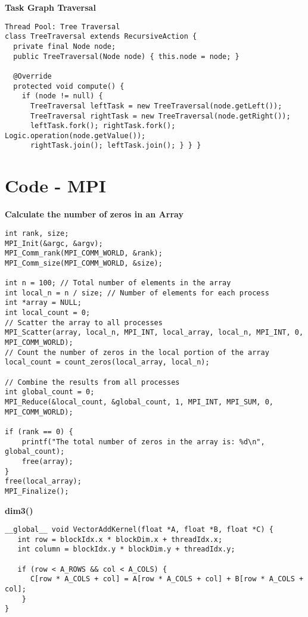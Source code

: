 \textbf{Task Graph Traversal}
\begin{lstlisting}[style=csharp]
Thread Pool: Tree Traversal
class TreeTraversal extends RecursiveAction {
  private final Node node;
  public TreeTraversal(Node node) { this.node = node; }
  
  @Override
  protected void compute() {
    if (node != null) {
      TreeTraversal leftTask = new TreeTraversal(node.getLeft());
      TreeTraversal rightTask = new TreeTraversal(node.getRight());
      leftTask.fork(); rightTask.fork(); Logic.operation(node.getValue());
      rightTask.join(); leftTask.join(); } } }

\end{lstlisting}

\section{Code - MPI}
\textbf{Calculate the number of zeros in an Array}
\begin{lstlisting}[style=csharp]
int rank, size;
MPI_Init(&argc, &argv);
MPI_Comm_rank(MPI_COMM_WORLD, &rank);
MPI_Comm_size(MPI_COMM_WORLD, &size);

int n = 100; // Total number of elements in the array
int local_n = n / size; // Number of elements for each process
int *array = NULL;
int local_count = 0;
// Scatter the array to all processes
MPI_Scatter(array, local_n, MPI_INT, local_array, local_n, MPI_INT, 0, MPI_COMM_WORLD);
// Count the number of zeros in the local portion of the array
local_count = count_zeros(local_array, local_n);

// Combine the results from all processes
int global_count = 0;
MPI_Reduce(&local_count, &global_count, 1, MPI_INT, MPI_SUM, 0, MPI_COMM_WORLD);

if (rank == 0) {
	printf("The total number of zeros in the array is: %d\n", global_count);
	free(array);
}
free(local_array);
MPI_Finalize();
\end{lstlisting}

\textbf{dim3()}
\begin{lstlisting}[style=csharp]
 __global__ void VectorAddKernel(float *A, float *B, float *C) {
   int row = blockIdx.x * blockDim.x + threadIdx.x;
   int column = blockIdx.y * blockDim.y + threadIdx.y;
   
   if (row < A_ROWS && col < A_COLS) {
      C[row * A_COLS + col] = A[row * A_COLS + col] + B[row * A_COLS + col];
	}	
}
\end{lstlisting}
